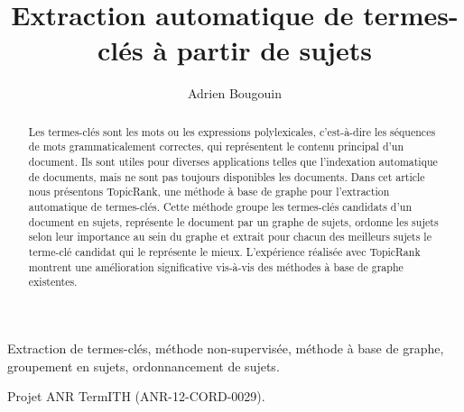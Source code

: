 \documentclass[fr]{jdoc}
\title{Extraction automatique de termes-clés à partir de sujets}
\author{Adrien Bougouin}
\begin{document}
  \makehead %

  \begin{abstract}
    Les termes-clés sont les mots ou les expressions polylexicales, c'est-à-dire
    les séquences de mots grammaticalement correctes, qui représentent le
    contenu principal d'un document. Ils sont utiles pour diverses applications
    telles que l'indexation automatique de documents, mais ne sont pas toujours
    disponibles les documents. Dans cet article nous présentons TopicRank, une
    méthode à base de graphe pour l'extraction automatique de termes-clés. Cette
    méthode groupe les termes-clés candidats d'un document en sujets,
    représente le document par un graphe de sujets, ordonne les sujets selon
    leur importance au sein du graphe et extrait pour chacun des meilleurs
    sujets le terme-clé candidat qui le représente le mieux. L'expérience
    réalisée avec TopicRank montrent une amélioration significative vis-à-vis
    des méthodes à base de graphe existentes.
  \end{abstract}

  \begin{keywords}
    Extraction de termes-clés, méthode non-supervisée, méthode à base de graphe,
    groupement en sujets, ordonnancement de sujets.
  \end{keywords}

  \begin{collaborations}
    Projet ANR TermITH (ANR-12-CORD-0029).
  \end{collaborations}

  
  
  
  

  
\end{document}
